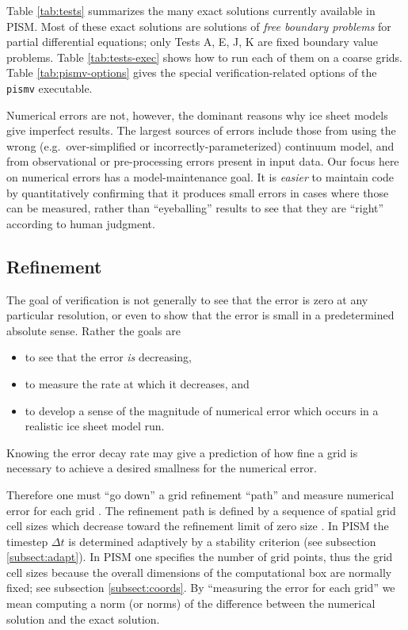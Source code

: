 Table \ref{tab:tests} summarizes the many exact solutions currently available in PISM.  Most of these exact solutions are solutions of \emph{free boundary problems} for partial differential equations; only Tests A, E, J, K are fixed boundary value problems.  Table \ref{tab:tests-exec} shows how to run each of them on a coarse grids.  Table \ref{tab:pismv-options} gives the special verification-related options of the \texttt{pismv} executable.

Numerical errors are not, however, the dominant reasons why ice sheet models give imperfect results.  The largest sources of errors include those from using the wrong (e.g.~over-simplified or incorrectly-parameterized) continuum model, and from observational or pre-processing errors present in input data.  Our focus here on numerical errors has a model-maintenance goal.  It is \emph{easier} to maintain code by quantitatively confirming that it produces small errors in cases where those can be measured, rather than ``eyeballing'' results to see that they are ``right'' according to human judgment.

\subsection{Refinement}  The goal of verification is not generally to see that the error is zero at any particular resolution, or even to show that the error is small in a predetermined absolute sense.  Rather the goals are
\begin{itemize}
\item to see that the error \emph{is} decreasing,
\item to measure the rate at which it decreases, and
\item to develop a sense of the magnitude of numerical error which occurs in a realistic ice sheet model run.
\end{itemize}
Knowing the error decay rate may give a prediction of how fine a grid is necessary to achieve a desired smallness for the numerical error.

Therefore one must ``go down'' a grid refinement ``path'' and measure numerical error for each grid \cite{Roache}.  The refinement path is defined by a sequence of spatial grid cell sizes which decrease toward the refinement limit of zero size \cite{MortonMayers}.  In PISM the timestep $\Delta t$ is determined adaptively by a stability criterion (see subsection \ref{subsect:adapt}).  In PISM one specifies the number of grid points, thus the grid cell sizes because the overall dimensions of the computational box are normally fixed; see subsection \ref{subsect:coords}.  By ``measuring the error for each grid'' we mean computing a norm (or norms) of the difference between the numerical solution and the exact solution.

